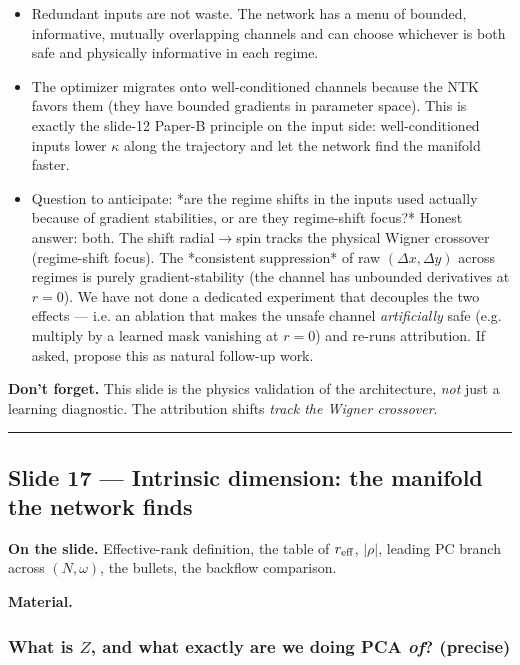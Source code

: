 \documentclass[11pt]{article}
\begin{document}
\begin{itemize}
\item Redundant inputs are not waste. The network has a menu of bounded,
informative, mutually overlapping channels and can choose whichever is
both safe and physically informative in each regime.
\item The optimizer migrates onto well-conditioned channels because the NTK
favors them (they have bounded gradients in parameter space). This is
exactly the slide-12 Paper-B principle on the input side: well-conditioned
inputs lower $\kappa$ along the trajectory and let the network find the
manifold faster.
\item Question to anticipate: *are the regime shifts in the inputs used
actually because of gradient stabilities, or are they regime-shift
focus?* Honest answer: both. The shift radial$\to$spin tracks the
physical Wigner crossover (regime-shift focus). The *consistent
suppression* of raw $(\Delta x, \Delta y)$ across regimes is purely
gradient-stability (the channel has unbounded derivatives at $r = 0$).
We have not done a dedicated experiment that decouples the two effects
--- i.e. an ablation that makes the unsafe channel \emph{artificially} safe
(e.g. multiply by a learned mask vanishing at $r = 0$) and re-runs
attribution. If asked, propose this as natural follow-up work.
\end{itemize}
\textbf{Don't forget.} This slide is the physics validation of the
architecture, \emph{not} just a learning diagnostic. The attribution shifts
\emph{track the Wigner crossover}.

\vspace{4pt}\hrule\vspace{8pt}

\subsection*{Slide 17 --- Intrinsic dimension: the manifold the network finds}

\textbf{On the slide.} Effective-rank definition, the table of $r_{\rm eff}$,
$|\rho|$, leading PC branch across $(N, \omega)$, the bullets, the
backflow comparison.

\textbf{Material.}

\subsubsection*{What is $Z$, and what exactly are we doing PCA \emph{of}? (precise)}
\end{document}
